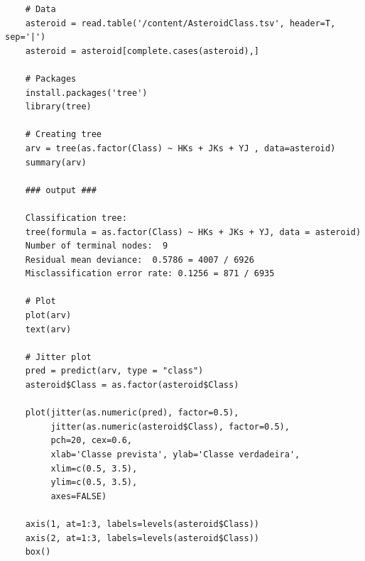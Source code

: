 \begin{lstlisting}
    # Data
    asteroid = read.table('/content/AsteroidClass.tsv', header=T, sep='|')
    asteroid = asteroid[complete.cases(asteroid),]

    # Packages
    install.packages('tree')
    library(tree)

    # Creating tree
    arv = tree(as.factor(Class) ~ HKs + JKs + YJ , data=asteroid)
    summary(arv)
    
    ### output ###
    
    Classification tree:
    tree(formula = as.factor(Class) ~ HKs + JKs + YJ, data = asteroid)
    Number of terminal nodes:  9 
    Residual mean deviance:  0.5786 = 4007 / 6926 
    Misclassification error rate: 0.1256 = 871 / 6935 
    
    # Plot
    plot(arv)
    text(arv)
    
    # Jitter plot
    pred = predict(arv, type = "class")
    asteroid$Class = as.factor(asteroid$Class)
    
    plot(jitter(as.numeric(pred), factor=0.5),
         jitter(as.numeric(asteroid$Class), factor=0.5),
         pch=20, cex=0.6,
         xlab='Classe prevista', ylab='Classe verdadeira',
         xlim=c(0.5, 3.5),
         ylim=c(0.5, 3.5),
         axes=FALSE)
    
    axis(1, at=1:3, labels=levels(asteroid$Class))
    axis(2, at=1:3, labels=levels(asteroid$Class))
    box()
\end{lstlisting}
